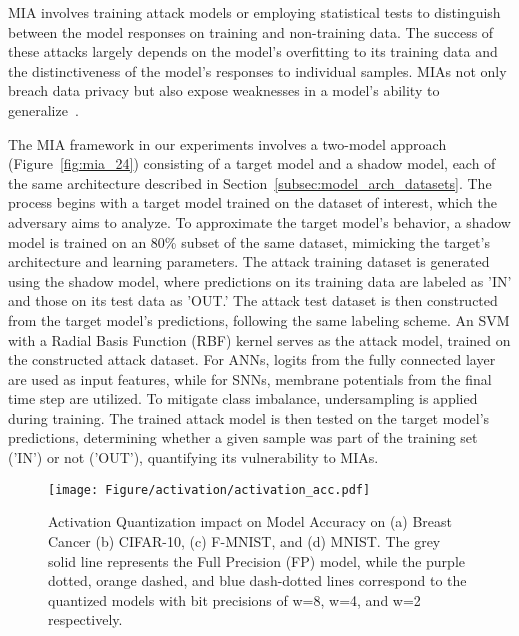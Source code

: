 MIA involves training attack models or employing statistical tests to distinguish between the model responses on training and non-training data. The success of these attacks largely depends on the model's overfitting to its training data and the distinctiveness of the model's responses to individual samples. MIAs not only breach data privacy but also expose weaknesses in a model's ability to generalize~\cite{gomm2000case}.

The MIA framework in our experiments involves a two-model approach (Figure~\ref{fig:mia_24}) consisting of a target model and a shadow model, each of the same architecture described in Section~\ref{subsec:model_arch_datasets}.  The process begins with a target model trained on the dataset of interest, which the adversary aims to analyze. To approximate the target model's behavior, a shadow model is trained on an 80\% subset of the same dataset, mimicking the target’s architecture and learning parameters. The attack training dataset is generated using the shadow model, where predictions on its training data are labeled as 'IN' and those on its test data as 'OUT.' The attack test dataset is then constructed from the target model’s predictions, following the same labeling scheme. An SVM with a Radial Basis Function (RBF) kernel serves as the attack model, trained on the constructed attack dataset. For ANNs, logits from the fully connected layer are used as input features, while for SNNs, membrane potentials from the final time step are utilized. To mitigate class imbalance, undersampling is applied during training. The trained attack model is then tested on the target model’s predictions, determining whether a given sample was part of the training set ('IN') or not ('OUT'), quantifying its vulnerability to MIAs.


\begin{figure*}[ht]
    \centering
    \texttt{[image: Figure/activation/activation\_acc.pdf]}
    \caption{Activation Quantization impact on Model Accuracy on (a) Breast Cancer (b) CIFAR-10, (c) F-MNIST, and (d) MNIST. The grey solid line represents the Full Precision (FP) model, while the purple dotted, orange dashed, and blue dash-dotted lines correspond to the quantized models with bit precisions of w=8, w=4, and w=2 respectively.} 
    \label{fig:act_acc}
\end{figure*}

